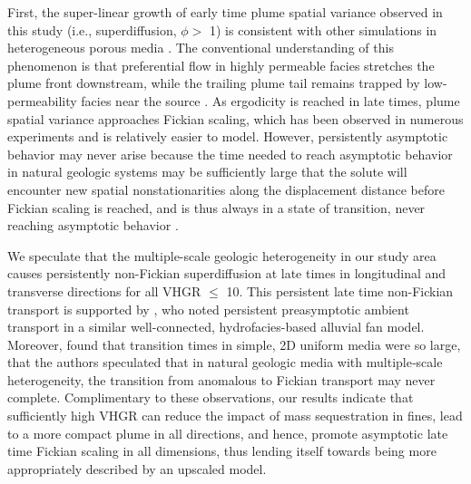 First, the super-linear growth of early time plume spatial variance observed in this study (i.e., superdiffusion, $\phi > $ 1) is consistent with other simulations in heterogeneous porous media \citep{zhang2013impact, kang2014pore, hunt2011dispersion}. The conventional understanding of this phenomenon is that preferential flow in highly permeable facies stretches the plume front downstream, while the trailing plume tail remains trapped by low-permeability facies near the source \citep{fiori2003flow, dagan2003flow, zhang2014linking, labolle2001role}. As ergodicity is reached in late times, plume spatial variance approaches Fickian scaling, which has been observed in numerous experiments \citep[e.g.][]{kang2014pore, le2010non, cortis2004numerical} and is relatively easier to model. However, persistently asymptotic behavior may never arise because the time needed to reach asymptotic behavior in natural geologic systems may be sufficiently large that the solute will encounter new spatial nonstationarities along the displacement distance before Fickian scaling is reached, and is thus always in a state of transition, never reaching asymptotic behavior \citep{matheron1980transport, gillham1984advection, neuman1990universal}.

We speculate that the multiple-scale geologic heterogeneity in our study area causes persistently non-Fickian superdiffusion at late times in longitudinal and transverse directions for all VHGR $\leq$ 10. This persistent late time non-Fickian transport is supported by \citet{labolle2001role}, who noted persistent preasymptotic ambient transport in a similar well-connected, hydrofacies-based alluvial fan model. Moreover, \citet{zhang2007persistence} found that transition times in simple, 2D uniform media were so large, that the authors speculated that in natural geologic media with multiple‐scale heterogeneity, the transition from anomalous to Fickian transport may never complete. Complimentary to these observations, our results indicate that sufficiently high VHGR can reduce the impact of mass sequestration in fines, lead to a more compact plume in all directions, and hence, promote asymptotic late time Fickian scaling in all dimensions, thus lending itself towards being more appropriately described by an upscaled model.  

